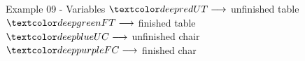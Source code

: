 \begin{frame}{Example 09 - Variables}
\large{
$\colora{UT} \longrightarrow$
    unfinished table  \\ \vspace{1cm}
$\colorb{FT} \longrightarrow$
    finished table \\ \vspace{1cm}
$\colorc{UC} \longrightarrow$
    unfinished chair \\ \vspace{1cm}
$\colord{FC} \longrightarrow$
    finished char
}
\end{frame}
